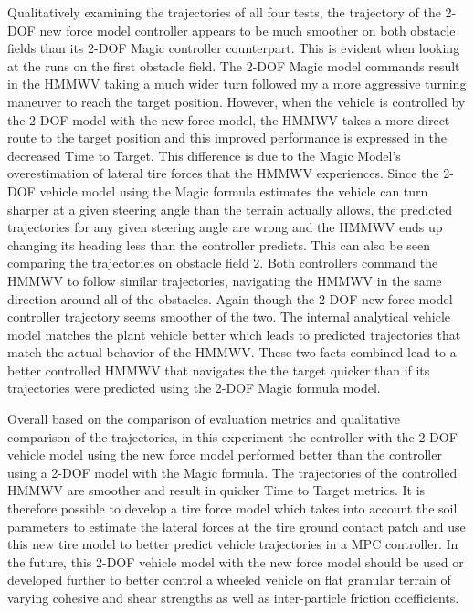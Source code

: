 \documentclass[12pt,onecolumn]{report}
\begin{document}
Qualitatively examining the trajectories of all four tests, the trajectory of the 2-DOF new force model controller appears to be much smoother on both obstacle fields than its 2-DOF Magic controller counterpart. This is evident when looking at the runs on the first obstacle field. The 2-DOF Magic model commands result in the HMMWV taking a much wider turn followed my a more aggressive turning maneuver to reach the target position. However, when the vehicle is controlled by the 2-DOF model with the new force model, the HMMWV takes a more direct route to the target position and this improved performance is expressed in the decreased Time to Target. This difference is due to the Magic Model's overestimation of lateral tire forces that the HMMWV experiences. Since the 2-DOF vehicle model using the Magic formula estimates the vehicle can turn sharper at a given steering angle than the terrain actually allows, the predicted trajectories for any given steering angle are wrong and the HMMWV ends up changing its heading less than the controller predicts. This can also be seen comparing the trajectories on obstacle field 2. Both controllers command the HMMWV to follow similar trajectories, navigating the HMMWV in the same direction around all of the obstacles. Again though the 2-DOF new force model controller trajectory seems smoother of the two. The internal analytical vehicle model matches the plant vehicle better which leads to predicted trajectories that match the actual behavior of the HMMWV. These two facts combined lead to a better controlled HMMWV that navigates the the target quicker than if its trajectories were predicted using the 2-DOF Magic formula model. 

Overall based on the comparison of evaluation metrics and qualitative comparison of the trajectories, in this experiment the controller with the 2-DOF vehicle model using the new force model performed better than the controller using a 2-DOF model with the Magic formula. The trajectories of the controlled HMMWV are smoother and result in quicker Time to Target metrics. It is therefore possible to develop a tire force model which takes into account the soil parameters to estimate the lateral forces at the tire ground contact patch and use this new tire model to better predict vehicle trajectories in a MPC controller. In the future, this 2-DOF vehicle model with the new force model should be used or developed further to better control a wheeled vehicle on flat granular terrain of varying cohesive and shear strengths as well as inter-particle friction coefficients. 
\end{document}
